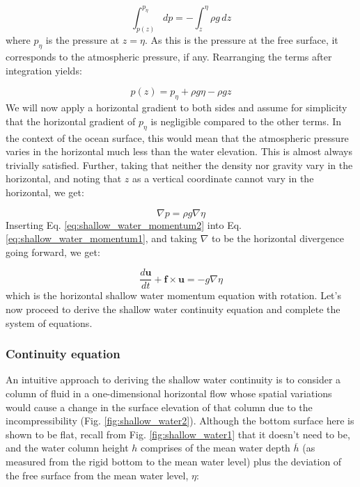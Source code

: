 \documentclass[12pt]{article}
\numberwithin{equation}{section}
\numberwithin{figure}{section}
\numberwithin{table}{section}
\begin{document}
\begin{equation}
  \int_{p(z)}^{p_\eta} dp = - \int_z^\eta \rho g \, dz
\end{equation}
where $p_\eta$ is the pressure at $z = \eta$.
As this is the pressure at the free surface, it corresponds to the atmospheric
pressure, if any.
Rearranging the terms after integration yields:

\begin{equation}
  p(z) = p_\eta + \rho g \eta - \rho g z
\end{equation}
We will now apply a horizontal gradient to both sides and assume for simplicity
that the horizontal gradient of $p_\eta$ is negligible compared to the other
terms.
In the context of the ocean surface, this would mean that the atmospheric
pressure varies in the horizontal much less than the water elevation.
This is almost always trivially satisfied.
Further, taking that neither the density nor gravity vary in the horizontal,
and noting that $z$ as a vertical coordinate cannot vary in the horizontal,
we get:

\begin{equation}
  \nabla p = \rho g \nabla \eta
  \label{eq:shallow_water_momentum2}
\end{equation}
Inserting Eq. \ref{eq:shallow_water_momentum2} into
Eq. \ref{eq:shallow_water_momentum1}, and taking $\nabla$ to be the horizontal
divergence going forward, we get:

\begin{equation}
  \frac{d \mathbf{u}}{dt} + \mathbf{f} \times \mathbf{u} =
  - g \nabla \eta
  \label{eq:shallow_water_momentum3}
\end{equation}
which is the horizontal shallow water momentum equation with rotation.
Let's now proceed to derive the shallow water continuity equation and complete
the system of equations.

\subsubsection{Continuity equation}

An intuitive approach to deriving the shallow water continuity is to consider
a column of fluid in a one-dimensional horizontal flow whose spatial variations
would cause a change in the surface elevation of that column due to the
incompressibility (Fig. \ref{fig:shallow_water2}).
Although the bottom surface here is shown to be flat, recall from Fig.
\ref{fig:shallow_water1} that it doesn't need to be, and the water column height
$h$ comprises of the mean water depth $\overline{h}$ (as measured from the rigid
bottom to the mean water level) plus the deviation of the free surface from the
mean water level, $\eta$:
\end{document}
